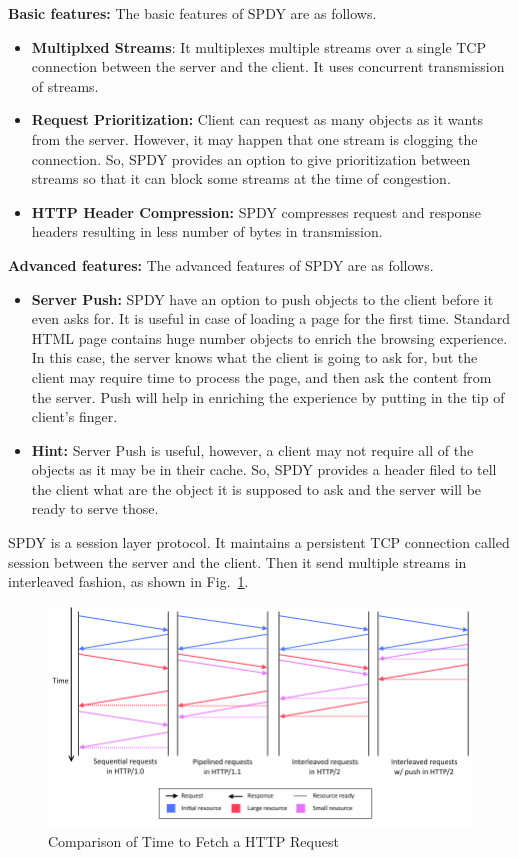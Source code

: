 \noindent \textbf{Basic features:} The basic features of SPDY are as follows. 
\begin{itemize}
    \item \textbf{Multiplxed Streams}: It multiplexes multiple streams over a single TCP connection between the server and the client. It uses concurrent transmission of streams.
    \item \textbf{Request Prioritization:} Client can request as many objects as it wants from the server. However, it may happen that one stream is clogging the connection. So, SPDY provides an option to give prioritization between streams so that it can block some streams at the time of congestion.
    \item \textbf{HTTP Header Compression:} SPDY compresses request and response headers resulting in less number of bytes in transmission.
\end{itemize}

\noindent \textbf{Advanced features:} The advanced features of SPDY are as follows. 
\begin{itemize}
    \item \textbf{Server Push:} SPDY have an option to push objects to the client before it even asks for. It is useful in case of loading a page for the first time. Standard HTML page contains huge number objects to enrich the browsing experience. In this case, the server knows what the client is going to ask for, but the client may require time to process the page, and then ask the content from the server. Push will help in enriching the experience by putting in the tip of client's finger.
    \item \textbf{Hint:} Server Push is useful, however, a client may not require all of the objects as it may be in their cache. So, SPDY provides a header filed to tell the client what are the object it is supposed to ask and the server will be ready to serve those.
\end{itemize}
SPDY is a session layer protocol. It maintains a persistent TCP connection called session between the server and the client. Then it send multiple streams in interleaved fashion, as shown in Fig.~\ref{fig:http-timing-diagram}.

\begin{figure}[h]
    \centering
    \includegraphics[width=0.8\linewidth]{img/spdy/http-timing-diagram}
    \caption{Comparison of Time to Fetch a HTTP Request}
    \label{fig:http-timing-diagram}
\end{figure}



